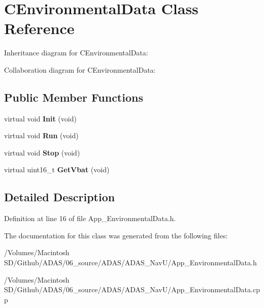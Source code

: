 \hypertarget{class_c_environmental_data}{}\section{C\+Environmental\+Data Class Reference}
\label{class_c_environmental_data}


Inheritance diagram for C\+Environmental\+Data\+:


Collaboration diagram for C\+Environmental\+Data\+:
\subsection*{Public Member Functions}
\begin{DoxyCompactItemize}
\item 
\mbox{\label{class_c_environmental_data_a3321cce122ef1e1f7e995ee51353e87d}} 
virtual void {\bfseries Init} (void)
\item 
\mbox{\label{class_c_environmental_data_a586a729d3aab2873812517d950c91242}} 
virtual void {\bfseries Run} (void)
\item 
\mbox{\label{class_c_environmental_data_a61a8f487f013602aab4dadcf8a9da4c8}} 
virtual void {\bfseries Stop} (void)
\item 
\mbox{\label{class_c_environmental_data_a12a6d60a2a0aa406beb82375fa60e875}} 
virtual uint16\+\_\+t {\bfseries Get\+Vbat} (void)
\end{DoxyCompactItemize}


\subsection{Detailed Description}


Definition at line 16 of file App\+\_\+\+Environmental\+Data.\+h.



The documentation for this class was generated from the following files\+:\begin{DoxyCompactItemize}
\item 
/\+Volumes/\+Macintosh S\+D/\+Github/\+A\+D\+A\+S/06\+\_\+source/\+A\+D\+A\+S/\+A\+D\+A\+S\+\_\+\+Nav\+U/App\+\_\+\+Environmental\+Data.\+h\item 
/\+Volumes/\+Macintosh S\+D/\+Github/\+A\+D\+A\+S/06\+\_\+source/\+A\+D\+A\+S/\+A\+D\+A\+S\+\_\+\+Nav\+U/App\+\_\+\+Environmental\+Data.\+cpp\end{DoxyCompactItemize}
